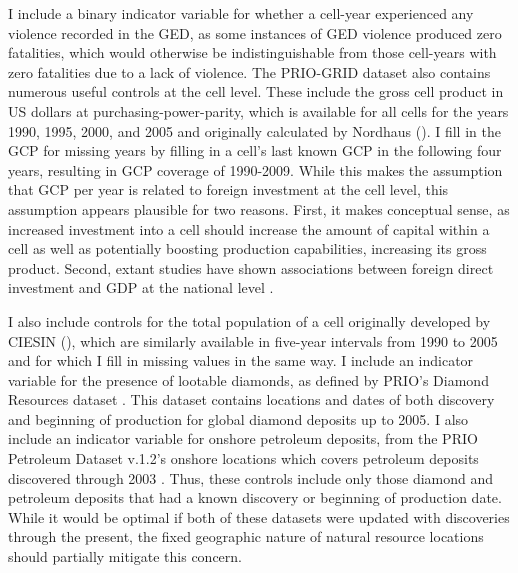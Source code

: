 I include a binary indicator variable for whether a cell-year experienced any violence recorded in the GED, as some instances of GED violence produced zero fatalities, which would otherwise be indistinguishable from those cell-years with zero fatalities due to a lack of violence. The PRIO-GRID dataset also contains numerous useful controls at the cell level. These include the gross cell product in US dollars at purchasing-power-parity, which is available for all cells for the years 1990, 1995, 2000, and 2005 and originally calculated by Nordhaus (\citeyear{nordhaus2006}). I fill in the GCP for missing years by filling in a cell's last known GCP in the following four years, resulting in GCP coverage of 1990-2009. While this makes the assumption that GCP per year is related to foreign investment at the cell level, this assumption appears plausible for two reasons. First, it makes conceptual sense, as increased investment into a cell should increase the amount of capital within a cell as well as potentially boosting production capabilities, increasing its gross product. Second, extant studies have shown associations between foreign direct investment and GDP at the national level \cite{AB17}.

I also include controls for the total population of a cell originally developed by CIESIN (\citeyear{ciesin2005}), which are similarly available in five-year intervals from 1990 to 2005 and for which I fill in missing values in the same way. I include an indicator variable for the presence of lootable diamonds, as defined by PRIO's Diamond Resources dataset \cite{Gilmore5,LGG5}. This dataset contains locations and dates of both discovery and beginning of production for global diamond deposits up to 2005. I also include an indicator variable for onshore petroleum deposits, from the PRIO Petroleum Dataset v.1.2's onshore locations \cite{LRT7} which covers petroleum deposits discovered through 2003 \cite{TRL7}. Thus, these controls include only those diamond and petroleum deposits that had a known discovery or beginning of production date. While it would be optimal if both of these datasets were updated with discoveries through the present, the fixed geographic nature of natural resource locations should partially mitigate this concern.

